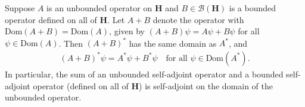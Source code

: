 \begin{proposition}
    \label{prpstn:hall-9.13}
    \leanok
    Suppose $A$ is an unbounded operator on $\mathbf{H}$ and $B \in \mathcal{B}(\mathbf{H})$ is a bounded operator defined on all of $\mathbf{H}$. Let $A + B$ denote the operator with $\text{Dom}(A+B) = \text{Dom}(A)$, given by $(A+B)\psi = A\psi + B\psi$ for all $\psi \in \text{Dom}(A)$. Then $(A+B)^*$ has the same domain as $A^*$, and
    \begin{align}
        (A+B)^*\psi = A^*\psi + B^*\psi \quad \text{for all } \psi \in \text{Dom}(A^*).
    \end{align}
    In particular, the sum of an unbounded self-adjoint operator and a bounded self-adjoint operator (defined on all of $\mathbf{H}$) is self-adjoint on the domain of the unbounded operator.
\end{proposition}
